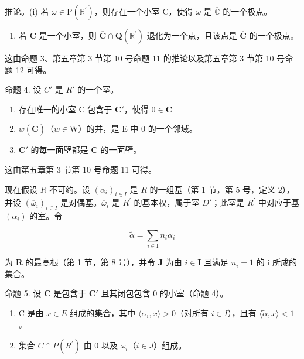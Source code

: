 推论。(i) 若 \(\overline{\omega} \in \mathrm{P}(\mathbb{R}^{\prime})\)，则存在一个小室 C，使得 \(\overline{\omega}\) 是 \(\overline{\mathbb{C}}\) 的一个极点。

\begin{enumerate}
\def\labelenumi{(\roman{enumi})}
\setcounter{enumi}{1}
\tightlist
\item
  若 \(\mathbf{C}\) 是一个小室，则 \(\overline{\mathbf{C}} \cap \mathbf{Q}(\mathbb{R}^{\prime})\) 退化为一个点，且该点是 \(\overline{\mathbf{C}}\) 的一个极点。
\end{enumerate}

这由命题 3、第五章第 3 节第 10 号命题 11 的推论以及第五章第 3 节第 10 号命题 12 可得。

命题 4. 设 \(C'\) 是 \(R'\) 的一个室。

\begin{enumerate}
\def\labelenumi{(\roman{enumi})}
\item
  存在唯一的小室 C 包含于 \(\mathbf{C}'\)，使得 \(0\in \overline{\mathbf{C}}\)
\item
  \(w(\overline{\mathbf{C}})\)（\(w\in \mathrm{W}\)）的并，是 E 中 0 的一个邻域。
\item
  \(\mathbf{C}'\) 的每一面壁都是 \(\mathbf{C}\) 的一面壁。
\end{enumerate}

这由第五章第 3 节第 10 号命题 11 可得。

现在假设 \(R\) 不可约。设 \((\alpha_i)_{i\in I}\) 是 \(R\) 的一组基（第 1 节，第 5 号，定义 2），并设 \((\overline{\omega}_i)_{i\in I}\) 是对偶基。\(\overline{\omega}_i\) 是 \(R^{\prime}\) 的基本权，属于室 \(D'\)；此室是 \(R^{\prime}\) 中对应于基 \((\alpha_i)\) 的室。令

\[
\tilde {\alpha} = \sum_ {i \in \mathrm{I}} n _ {i} \alpha_ {i}
\]

为 \(\mathbf{R}\) 的最高根（第 1 节，第 8 号），并令 \(\mathbf{J}\) 为由 \(i \in \mathbf{I}\) 且满足 \(n_i = 1\) 的 i 所成的集合。

命题 5. 设 \(\mathbf{C}\) 是包含于 \(\mathbf{C}'\) 且其闭包包含 0 的小室（命题 4）。

\begin{enumerate}
\def\labelenumi{(\roman{enumi})}
\tightlist
\item
  C 是由 \(x \in E\) 组成的集合，其中 \(\langle\alpha_{i}, x\rangle > 0\)（对所有 \(i \in I\)），且有 \(\langle\tilde{\alpha}, x\rangle < 1\)。
\item
  集合 \(\overline{C} \cap P(R^{\prime})\) 由 0 以及 \(\overline{\omega}_{i}\)（\(i \in J\)）组成。
\end{enumerate}

